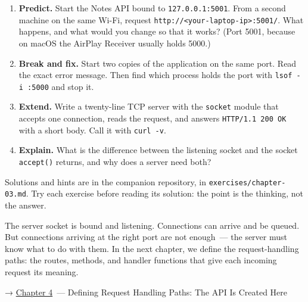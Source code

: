 \begin{enumerate}
\def\labelenumi{\arabic{enumi}.}
\tightlist
\item
  \textbf{Predict.} Start the Notes API bound to \texttt{127.0.0.1:5001}. From a second machine on the same Wi-Fi, request \texttt{http:}\allowbreak{}\texttt{/}\allowbreak{}\texttt{/}\allowbreak{}\texttt{\textless{}your-}\allowbreak{}\texttt{laptop-}\allowbreak{}\texttt{ip\textgreater{}:}\allowbreak{}\texttt{5001/}. What happens, and what would you change so that it works? (Port 5001, because on macOS the AirPlay Receiver usually holds 5000.)
\item
  \textbf{Break and fix.} Start two copies of the application on the same port. Read the exact error message. Then find which process holds the port with \texttt{lsof\ -i\ :5000} and stop it.
\item
  \textbf{Extend.} Write a twenty-line TCP server with the \texttt{socket} module that accepts one connection, reads the request, and answers \texttt{HTTP/1.1\ 200\ OK} with a short body. Call it with \texttt{curl\ -v}.
\item
  \textbf{Explain.} What is the difference between the listening socket and the socket \texttt{accept()} returns, and why does a server need both?
\end{enumerate}

\noindent{}Solutions and hints are in the companion repository, in \texttt{exercises/}\allowbreak{}\texttt{chapter-03.md}. Try each exercise before reading its solution: the point is the thinking, not the answer.

\label{03-network-capability:whats-next}

The server socket is bound and listening. Connections can arrive and be queued. But connections arriving at the right port are not enough~--- the server must know what to do with them. In the next chapter, we define the request-handling paths: the routes, methods, and handler functions that give each incoming request its meaning.

\noindent{}→ \hyperref[ch:04-request-handling-paths]{Chapter 4}~--- Defining Request Handling Paths: The API Is Created Here
